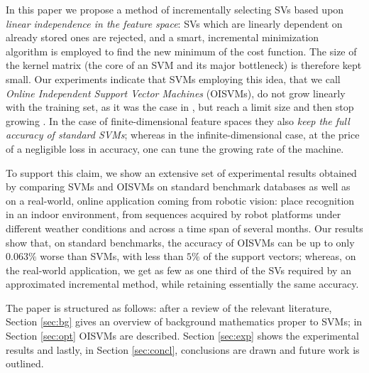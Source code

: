 In this paper we propose a method of incrementally selecting SVs based
upon \emph{linear independence in the feature space}: SVs which are
linearly dependent on already stored ones are rejected, and a smart,
incremental minimization algorithm is employed to find the new minimum
of the cost function. The size of the kernel matrix (the core of an
SVM and its major bottleneck) is therefore kept small. Our experiments
indicate that SVMs employing this idea, that we call
\emph{Online Independent Support Vector Machines} (OISVMs), do not
grow linearly with the training set, as it was the case in
\cite{Steinwart03}, but reach a limit size and then stop growing
\cite{engel2004}. In the case of finite-dimensional feature spaces
they also \emph{keep the full accuracy of standard SVMs}; whereas in
the infinite-dimensional case, at the price of a negligible loss in
accuracy, one can tune the growing rate of the machine.

To support this claim, we show an extensive set of experimental
results obtained by comparing SVMs and OISVMs on standard benchmark
databases as well as on a real-world, online application coming from
robotic vision: place recognition in an indoor environment, from
sequences acquired by robot platforms under different weather
conditions and across a time span of several months. Our results show
that, on standard benchmarks, the accuracy of OISVMs can be up to only
$0.063\%$ worse than SVMs, with less than $5\%$ of the support
vectors; whereas, on the real-world application, we get as few as one
third of the SVs required by an approximated incremental method, while
retaining essentially the same accuracy.

The paper is structured as follows: after a review of the relevant
literature, Section \ref{sec:bg} gives an overview of background
mathematics proper to SVMs; in Section \ref{sec:opt} OISVMs are
described.  Section \ref{sec:exp}  shows the experimental results
and lastly, in Section \ref{sec:concl}, conclusions are drawn and future
work is outlined.
